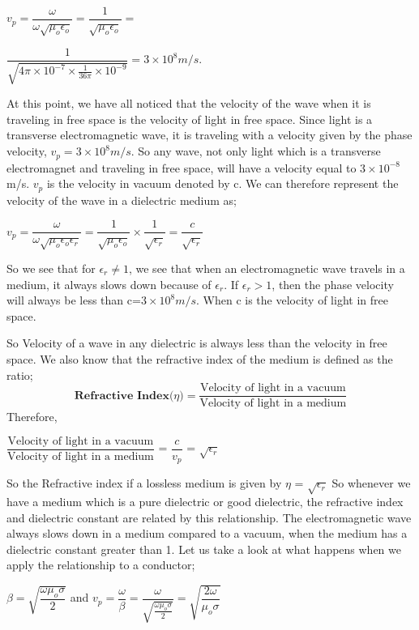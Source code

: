 $v_p=\dfrac{\omega}{\omega\sqrt{\mu_{o}\epsilon_{o}}}=\dfrac{1}{\sqrt{\mu_{o}\epsilon_{o}}}=$ 

$\dfrac{1}{\sqrt{4\pi\times 10^{-7}\times \frac{1}{36\pi}\times 10^{-9}}}=3\times 10^{8}m/s.$

At this point, we have all noticed that the velocity of the wave when it is traveling in free space is the velocity of light in free space. Since light is a transverse electromagnetic wave, it is traveling with a velocity given by the phase velocity, $v_p=3\times 10^{8}m/s$. So any wave, not only light which is a transverse electromagnet and traveling in free space, will have a velocity equal to $3\times 10^{-8}$m/s. $v_p$ is the velocity in vacuum denoted by c.
We can therefore represent the velocity of the wave in a dielectric medium as;

$v_p=\dfrac{\omega}{\omega\sqrt{\mu_{o}\epsilon_{o}\epsilon_{r}}}=\dfrac{1}{\sqrt{\mu_{o}\epsilon_{o}}}\times \dfrac{1}{\sqrt{\epsilon_{r}}}=\dfrac{c}{\sqrt{\epsilon_{r}}}$

So we see that for $\epsilon_{r}\neq 1$, we see that when an electromagnetic wave travels in a medium, it always slows down because of $\epsilon_{r}$. If $\epsilon_{r}>1$, then the phase velocity will always be less than c=$3\times 10^{8}m/s$. When c is the velocity of light in free space.

So Velocity of a wave in any dielectric is always less than the velocity in free space. We also know that the refractive index of the medium is defined as the ratio;
\begin{equation}
\textbf{Refractive Index($\eta$)} =	\dfrac{\text{Velocity of light in a vacuum}}{\text{Velocity of light in a medium}}
\end{equation}
Therefore,
\begin{center}
$\dfrac{\text{Velocity of light in a vacuum}}{\text{Velocity of light in a medium}}$	
= $\dfrac{c}{v_{p}}$ = $\sqrt{\epsilon_{r}}$  
\end{center}

So the Refractive index if a lossless medium is given by  $\eta$ = $\sqrt{\epsilon_{r}}$ So whenever we have a medium which is a pure dielectric or good dielectric, the refractive index and dielectric constant are related by this relationship. The electromagnetic wave always slows down in a medium compared to a vacuum, when the medium has a dielectric constant greater than 1.
Let us take a look at what happens when we apply the relationship to a conductor;

$\beta=\sqrt{\dfrac{\omega\mu_{o}\sigma}{2}}$  and   $v_p=\dfrac{\omega}{\beta}=\dfrac{\omega}{\sqrt{\frac{\omega\mu_{o}\sigma}{2}}}=\sqrt{\dfrac{2\omega}{\mu_{o}\sigma}}$

